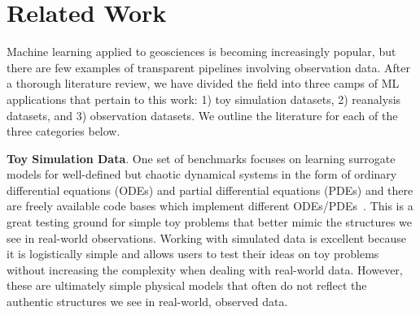 \section{Related Work}

Machine learning applied to geosciences is becoming increasingly popular, but there are few examples of transparent pipelines involving observation data. 
After a thorough literature review, we have divided the field into three camps of ML applications that pertain to this work: 1) toy simulation datasets, 2) reanalysis datasets, and 3) observation datasets. 
We outline the literature for each of the three categories below.

\textbf{Toy Simulation Data}. 
One set of benchmarks focuses on learning surrogate models for well-defined but chaotic dynamical systems in the form of ordinary differential equations (ODEs) and partial differential equations (PDEs) and there are freely available code bases which implement different ODEs/PDEs~\citep{CHAOSBENCH,PDEBench,pyQG,JAXCFD,NCARDART,NCARDARTSOFTWARE,VEROS,OCEANANIGANS}.
This is a great testing ground for simple toy problems that better mimic the structures we see in real-world observations. 
Working with simulated data is excellent because it is logistically simple and allows users to test their ideas on toy problems without increasing the complexity when dealing with real-world data.
However, these are ultimately simple physical models that often do not reflect the authentic structures we see in real-world, observed data.

